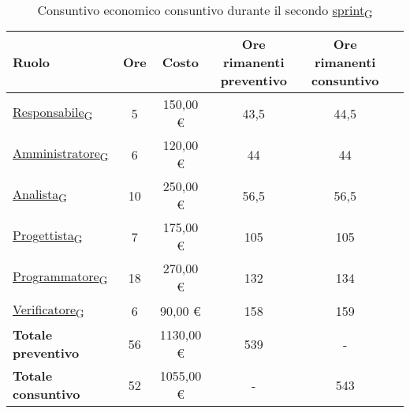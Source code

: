 \begin{table}[!h]
	\centering
	\begin{tabular}{ | l | c | c | c | c | c | }
		\hline
		\textbf{Ruolo}             & \textbf{Ore} & \textbf{Costo} & \textbf{Ore rimanenti preventivo} & \textbf{Ore rimanenti consuntivo} \\
		\hline
		\href{https://7last.github.io/docs/rtb/documentazione-interna/glossario\#responsabile}{Responsabile\textsubscript{G}}               & 5            & 150,00 €       & 43,5                              & 44,5                              \\
		\href{https://7last.github.io/docs/rtb/documentazione-interna/glossario\#amministratore}{Amministratore\textsubscript{G}}             & 6            & 120,00 €       & 44                                & 44                                \\
		\href{https://7last.github.io/docs/rtb/documentazione-interna/glossario\#analista}{Analista\textsubscript{G}}                   & 10           & 250,00 €       & 56,5                              & 56,5                              \\
		\href{https://7last.github.io/docs/rtb/documentazione-interna/glossario\#progettista}{Progettista\textsubscript{G}}                & 7            & 175,00 €       & 105                               & 105                               \\
		\href{https://7last.github.io/docs/rtb/documentazione-interna/glossario\#programmatore}{Programmatore\textsubscript{G}}              & 18           & 270,00 €       & 132                               & 134                               \\
		\href{https://7last.github.io/docs/rtb/documentazione-interna/glossario\#verificatore}{Verificatore\textsubscript{G}}               & 6            & 90,00 €        & 158                               & 159                               \\
		\hline
		\textbf{Totale preventivo} & 56           & 1130,00 €      & 539                               & -                                 \\
		\hline
		\textbf{Totale consuntivo} & 52           & 1055,00 €      & -                                 & 543                               \\
		\hline
	\end{tabular}
	\caption{Consuntivo economico consuntivo durante il secondo \href{https://7last.github.io/docs/rtb/documentazione-interna/glossario\#sprint}{sprint\textsubscript{G}}}
	
\end{table}

